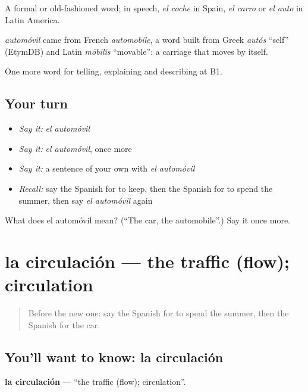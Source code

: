 A formal or old-fashioned word; in speech, \emph{el coche} in Spain, \emph{el carro} or \emph{el auto} in Latin America.

\begin{cousinweb}
\emph{automóvil} came from French \emph{automobile}, a word built from Greek \emph{autós} \textquotedblleft{}self\textquotedblright{} (EtymDB) and Latin \emph{mōbilis} \textquotedblleft{}movable\textquotedblright{}: a carriage that moves by itself.
\end{cousinweb}

\begin{grammarlens}[title={What you've built}]
One more word for telling, explaining and describing at B1.
\end{grammarlens}

\subsection*{Your turn}
\begin{itemize}
\raggedright
  \item \emph{Say it:} \emph{el automóvil}
  \item \emph{Say it:} \emph{el automóvil}, once more
  \item \emph{Say it:} a sentence of your own with \emph{el automóvil}
  \item \emph{Recall:} say the Spanish for to keep, then the Spanish for to spend the summer, then say \emph{el automóvil} again
\end{itemize}

\begin{tcolorbox}[breakable,colback=teal!4,colframe=teal!35!black,title={Before you move on}]
What does el automóvil mean? (\textquotedblleft{}The car, the automobile\textquotedblright{}.) Say it once more.
\end{tcolorbox}
\section[la circulación]{la circulación — the traffic (flow); circulation}

\label{lesson:ES-C640-circulacion}



\begin{quote}
Before the new one: say the Spanish for to spend the summer, then the Spanish for the car.
\end{quote}

\subsection*{You'll want to know: la circulación}
\textbf{la circulación} — \textquotedblleft{}the traffic (flow); circulation\textquotedblright{}.

